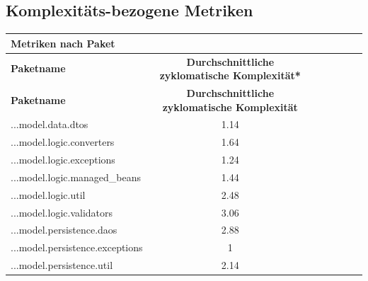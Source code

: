 \documentclass{article}
\begin{document}
\subsection{Komplexitäts-bezogene Metriken}

\begin{longtable}{@{\extracolsep{\fill}}lclclcl@{}}
\toprule
\multicolumn{4}{l}{\textbf{Metriken nach Paket}} \\* \midrule
\textbf{Paketname} & \textbf{Durchschnittliche zyklomatische Komplexität*} \\* \midrule
\endfirsthead
\textbf{Paketname} & \textbf{Durchschnittliche zyklomatische Komplexität} \\* \midrule
\endhead
...model.data.dtos 				& 1.14 \\
...model.logic.converters			& 1.64 \\
...model.logic.exceptions			& 1.24 \\
...model.logic.managed\_beans		& 1.44 \\
...model.logic.util					& 2.48 \\
...model.logic.validators			& 3.06 \\
...model.persistence.daos			& 2.88 \\
...model.persistence.exceptions		& 1 \\
...model.persistence.util			& 2.14 \\* \bottomrule
\end{longtable}
\end{document}
